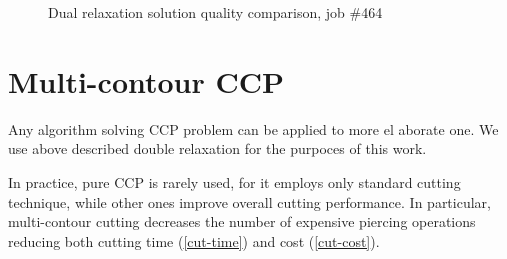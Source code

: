 \documentclass{../download/tPRS2e}
\begin{document}
\begin{figure}
    \begin{center}
    \caption{Dual relaxation solution quality comparison, job \#464} \label{quality}
    \end{center}
\end{figure}

\hrulefill

\section{Multi-contour CCP}

Any algorithm solving CCP problem
can be applied to more el aborate one.
We use above described double relaxation
for the purpoces of this work.

In practice, pure CCP is rarely used,
for it employs only standard cutting technique,
while other ones improve overall cutting performance.
In particular,
multi-contour cutting decreases
the number of expensive piercing operations
reducing both cutting time (\ref{cut-time})
and cost (\ref{cut-cost}).
\end{document}
